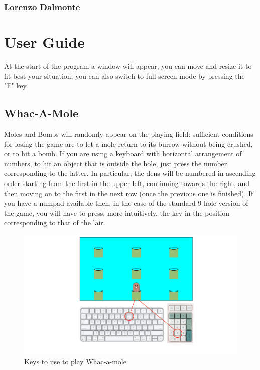 \documentclass[a4paper,12pt]{report}
\begin{document}
\subsection*{Lorenzo Dalmonte}


\appendix
\chapter{User Guide}
At the start of the program a window will appear, you can move and resize it to fit best your situation, you can also {\color{red}switch to full screen mode by pressing the "F" key}.
\section*{Whac-A-Mole}
Moles and Bombs will randomly appear on the playing field: sufficient conditions for losing the game are to let a mole return to its
burrow without being crushed, or to hit a bomb. If you are using a keyboard with horizontal arrangement of numbers, to hit an object that
is outside the hole, just press the number corresponding to the latter. In particular, the dens will be numbered in ascending order starting
from the first in the upper left, continuing towards the right, and then moving on to the first in the next row (once the previous one is
finished). If you have a numpad available then, in the case of the standard 9-hole version of the game, you will have to press, more intuitively,
the key in the position corresponding to that of the lair.
\begin{figure}[!htbp]
	\centering{}
	\includegraphics[width=\textwidth]{res/InstructionsWam.pdf}
	\caption{Keys to use to play Whac-a-mole}
\end{figure}
\end{document}
